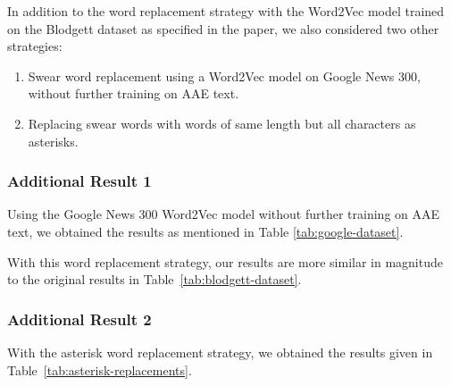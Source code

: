 In addition to the word replacement strategy with the Word2Vec model trained on the Blodgett dataset as specified in the paper, we also considered two other strategies:
\begin{enumerate}
   \item  Swear word replacement using a Word2Vec model on Google News 300, without further training on AAE text.
   \item  Replacing swear words with words of same length but all characters as asterisks.
\end{enumerate}
 

\subsubsection{Additional Result 1}
Using the Google News 300 Word2Vec model without further training on AAE text, we obtained the results as mentioned in Table \ref{tab:google-dataset}.
\begin{table}[h]
\centering
\caption{Results for the Google News 300 Word2Vec without training on AAE text}
\label{tab:google-dataset}
\end{table}

With this word replacement strategy, our results are more similar in magnitude to the original results in Table~\ref{tab:blodgett-dataset}.

\subsubsection{Additional Result 2}
With the asterisk word replacement strategy, we obtained the results given in Table~\ref{tab:asterisk-replacements}.
\begin{table}[h]
\centering
\caption{Results for the Asterisks word replacements}
\label{tab:asterisk-replacements}
\end{table}


